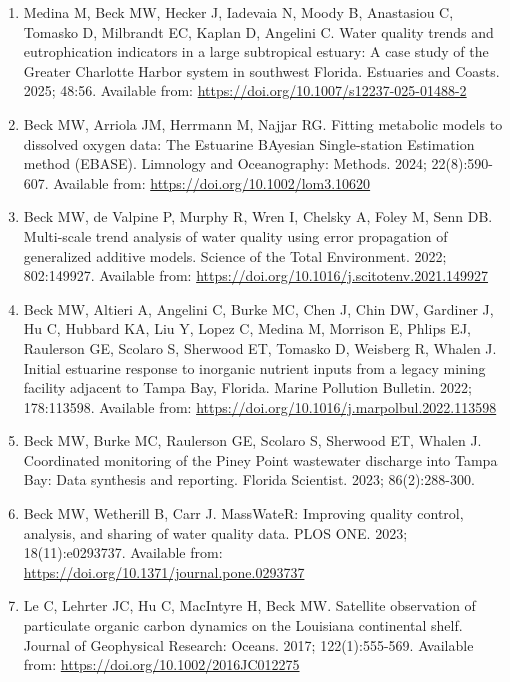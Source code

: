 \documentclass[letterpaper,11pt]{article}
\begin{document}
\begin{enumerate}[leftmargin=1.8em,itemsep=6pt,topsep=2pt]
\item Medina M, Beck MW, Hecker J, Iadevaia N, Moody B, Anastasiou C, Tomasko D, Milbrandt EC, Kaplan D, Angelini C. Water quality trends and eutrophication indicators in a large subtropical estuary: A case study of the Greater Charlotte Harbor system in southwest Florida. Estuaries and Coasts. 2025; 48:56. Available from: \url{https://doi.org/10.1007/s12237-025-01488-2}

\item Beck MW, Arriola JM, Herrmann M, Najjar RG. Fitting metabolic models to dissolved oxygen data: The Estuarine BAyesian Single-station Estimation method (EBASE). Limnology and Oceanography: Methods. 2024; 22(8):590-607. Available from: \url{https://doi.org/10.1002/lom3.10620}

\item Beck MW, de Valpine P, Murphy R, Wren I, Chelsky A, Foley M, Senn DB. Multi-scale trend analysis of water quality using error propagation of generalized additive models. Science of the Total Environment. 2022; 802:149927. Available from: \url{https://doi.org/10.1016/j.scitotenv.2021.149927}

\item Beck MW, Altieri A, Angelini C, Burke MC, Chen J, Chin DW, Gardiner J, Hu C, Hubbard KA, Liu Y, Lopez C, Medina M, Morrison E, Phlips EJ, Raulerson GE, Scolaro S, Sherwood ET, Tomasko D, Weisberg R, Whalen J. Initial estuarine response to inorganic nutrient inputs from a legacy mining facility adjacent to Tampa Bay, Florida. Marine Pollution Bulletin. 2022; 178:113598. Available from: \url{https://doi.org/10.1016/j.marpolbul.2022.113598}

\item Beck MW, Burke MC, Raulerson GE, Scolaro S, Sherwood ET, Whalen J. Coordinated monitoring of the Piney Point wastewater discharge into Tampa Bay: Data synthesis and reporting. Florida Scientist. 2023; 86(2):288-300.

\item Beck MW, Wetherill B, Carr J. MassWateR: Improving quality control, analysis, and sharing of water quality data. PLOS ONE. 2023; 18(11):e0293737. Available from: \url{https://doi.org/10.1371/journal.pone.0293737}

\item Le C, Lehrter JC, Hu C, MacIntyre H, Beck MW. Satellite observation of particulate organic carbon dynamics on the Louisiana continental shelf. Journal of Geophysical Research: Oceans. 2017; 122(1):555-569. Available from: \url{https://doi.org/10.1002/2016JC012275}


\end{enumerate}
\end{document}
